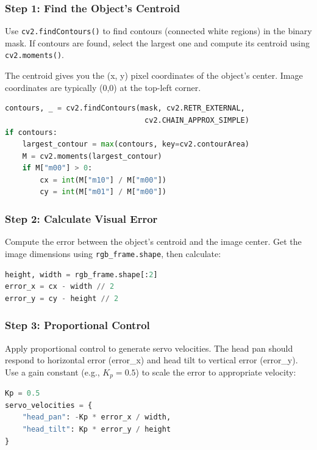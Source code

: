 \documentclass[11pt,a4paper]{article}
\begin{document}
\subsubsection*{Step 1: Find the Object's Centroid}

Use \texttt{cv2.findContours()} to find contours (connected white regions) in the binary mask. If contours are found, select the largest one and compute its centroid using \texttt{cv2.moments()}.

The centroid gives you the (x, y) pixel coordinates of the object's center. Image coordinates are typically (0,0) at the top-left corner.

\begin{lstlisting}[language=Python]
contours, _ = cv2.findContours(mask, cv2.RETR_EXTERNAL, 
                                cv2.CHAIN_APPROX_SIMPLE)
if contours:
    largest_contour = max(contours, key=cv2.contourArea)
    M = cv2.moments(largest_contour)
    if M["m00"] > 0:
        cx = int(M["m10"] / M["m00"])
        cy = int(M["m01"] / M["m00"])
\end{lstlisting}

\subsubsection*{Step 2: Calculate Visual Error}

Compute the error between the object's centroid and the image center. Get the image dimensions using \texttt{rgb\_frame.shape}, then calculate:

\begin{lstlisting}[language=Python]
height, width = rgb_frame.shape[:2]
error_x = cx - width // 2
error_y = cy - height // 2
\end{lstlisting}

\subsubsection*{Step 3: Proportional Control}

Apply proportional control to generate servo velocities. The head pan should respond to horizontal error (error\_x) and head tilt to vertical error (error\_y). Use a gain constant (e.g., $K_p = 0.5$) to scale the error to appropriate velocity:

\begin{lstlisting}[language=Python]
Kp = 0.5
servo_velocities = {
    "head_pan": -Kp * error_x / width,
    "head_tilt": Kp * error_y / height
}
\end{lstlisting}
\end{document}
